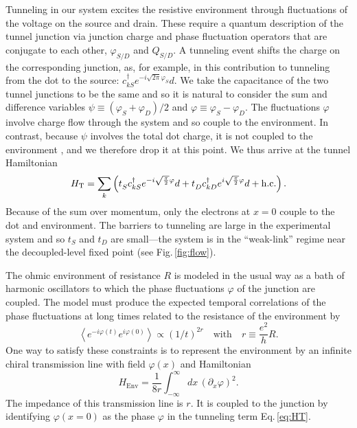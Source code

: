 \documentclass[aps,prb,reprint,floatfix,superscriptaddress,amssymb,amsmath]{revtex4-2}
\newcommand{\phdag}{{\phantom{\dagger}}}
\begin{document}
Tunneling in our system excites the resistive environment through fluctuations of the voltage on the source and drain. These require a quantum description of the tunnel junction \cite{IngoldNazarov92,NazarovBlanterBook,DevoretEsteveUrbina95,VoolDevoretIJCTA17} via junction charge and phase fluctuation operators that are conjugate to each other, $\varphi_{S/D}$ and  $Q_{S/D}$. A tunneling event shifts the charge on the corresponding junction, as, for example, in this contribution to tunneling from the dot to the source:  
$c_{kS}^{\dagger}e^{-i\sqrt{2\pi}\varphi_{S}}d$. 
We take the capacitance of the two tunnel junctions to be the same and so it is natural to consider the sum and difference variables 
$\psi \equiv (\varphi_S + \varphi_D)/2$ and 
$\varphi \equiv \varphi_S - \varphi_D$.
The fluctuations $\varphi$ involve charge flow through the system and so couple to the environment. In contrast, because $\psi$ involves the total dot charge, it is not coupled to the environment \cite{IngoldNazarov92,NazarovBlanterBook,LiuRLdissipPRB14}, and we therefore drop it at this point. 
We thus arrive at the tunnel Hamiltonian
\begin{equation}
H_\text{T}= \sum_k \left( t_S^\phdag c_{kS}^{\dagger}e^{-i\sqrt{\frac{\pi}{2}} \varphi}d
+t_D^\phdag c_{kD}^{\dagger}e^{i\sqrt{\frac{\pi}{2}} \varphi}d+{\rm h.c.} \right).
\label{eq:HT}
\end{equation} 
Because of the sum over momentum, only the electrons at $x\!=\!0$ couple to the dot and environment. 
The barriers to tunneling are large in the experimental system and so  $t_S$ and $t_D$ are small---the system is in the ``weak-link'' regime near the decoupled-level fixed point (see Fig.\,\ref{fig:flow}). 

The ohmic environment of resistance $R$ is modeled in the usual way as a bath of harmonic oscillators to which the phase fluctuations $\varphi$ of the junction are coupled. The model must produce the expected temporal correlations of the phase fluctuations at long times related to the resistance of the environment by \cite{IngoldNazarov92,NazarovBlanterBook,DevoretEsteveUrbina95,VoolDevoretIJCTA17} 
\begin{equation}
\left\langle e^{-i\varphi(t)}e^{i\varphi(0)} \right\rangle \propto (1/t)^{2r} 
\quad\text{with}\quad r\equiv \frac{e^2}{h}R.
\end{equation}
One way to satisfy these constraints is to represent the environment by an infinite chiral transmission line with field $\varphi(x)$ and Hamiltonian \cite{LiuRLdissipPRB14} 
\begin{equation}
H_\text{Env} =  \frac{1}{8 r} \int_{-\infty}^{\infty} \!\!dx \,(\partial_x \varphi)^2.
\label{eq:Henv}
\end{equation}
The impedance of this transmission line is $r$. It is coupled to the junction by identifying  $\varphi(x\!=\!0)$ as the phase  $\varphi$ in the tunneling term Eq.\,\eqref{eq:HT}. 
\end{document}
